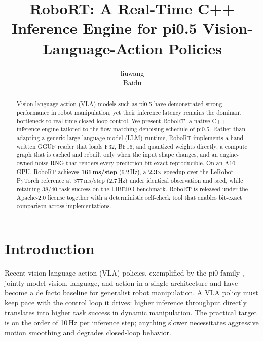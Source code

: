 \documentclass[11pt]{article}
\title{\textbf{RoboRT: A Real-Time C++ Inference Engine for pi0.5 Vision-Language-Action Policies}}
\author{liuwang\\[2pt] Baidu}
\date{}
\begin{document}
\maketitle

\begin{abstract}
Vision-language-action (VLA) models such as pi0.5 have demonstrated strong
performance in robot manipulation, yet their inference latency remains the
dominant bottleneck to real-time closed-loop control. We present RoboRT, a
native C++ inference engine tailored to the flow-matching denoising schedule
of pi0.5. Rather than adapting a generic large-language-model (LLM) runtime,
RoboRT implements a hand-written GGUF reader that loads F32, BF16, and
quantized weights directly, a compute graph that is cached and rebuilt only
when the input shape changes, and an engine-owned noise RNG that renders
every prediction bit-exact reproducible. On an A10 GPU, RoboRT achieves
\textbf{161\,ms/step} (6.2\,Hz), a \textbf{2.3$\times$} speedup over the
LeRobot PyTorch reference at 377\,ms/step (2.7\,Hz) under identical
observation and seed, while retaining 38/40 task success on the LIBERO
benchmark. RoboRT is released under the Apache-2.0 license together with a
deterministic self-check tool that enables bit-exact comparison across
implementations.
\end{abstract}

\section{Introduction}
\label{sec:intro}

Recent vision-language-action (VLA) policies, exemplified by the pi0 family
\cite{pi0}, jointly model vision, language, and action in a single
architecture and have become a de facto baseline for generalist robot
manipulation. A VLA policy must keep pace with the control loop it drives:
higher inference throughput directly translates into higher task success in
dynamic manipulation. The practical target is on the order of 10\,Hz per
inference step; anything slower necessitates aggressive motion smoothing and
degrades closed-loop behavior.
\end{document}
